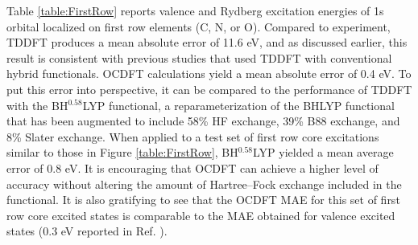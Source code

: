 \documentclass[12pt]{article}
\begin{document}
Table \ref{table:FirstRow} reports valence and Rydberg excitation energies of 1s orbital localized on first row elements (C, N, or O). Compared to experiment, TDDFT produces a mean absolute error of 11.6 eV, and as discussed earlier, this result is consistent with previous studies that used TDDFT with conventional hybrid functionals.\cite{besley_self-consistent-field_2009} OCDFT calculations yield a mean absolute error of 0.4 eV. To put this error into perspective, it can be compared to the performance of TDDFT with the BH$^{0.58}$LYP functional,\cite{besley_time-dependent_2009} a reparameterization of the BHLYP functional\cite{becke_new_1993,lee_development_1988-1} that has been augmented to include 58\% HF exchange, 39\% B88 exchange, and 8\% Slater exchange. When applied to a test set of first row core excitations similar to those in Figure \ref{table:FirstRow}, BH$^{0.58}$LYP yielded a mean average error of 0.8 eV. It is encouraging that OCDFT can achieve a higher level of accuracy without altering the amount of Hartree--Fock exchange included in the functional. It is also gratifying to see that the OCDFT MAE for this set of first row core excited states is comparable to the MAE obtained for valence excited states (0.3 eV reported in Ref. ).
\end{document}

